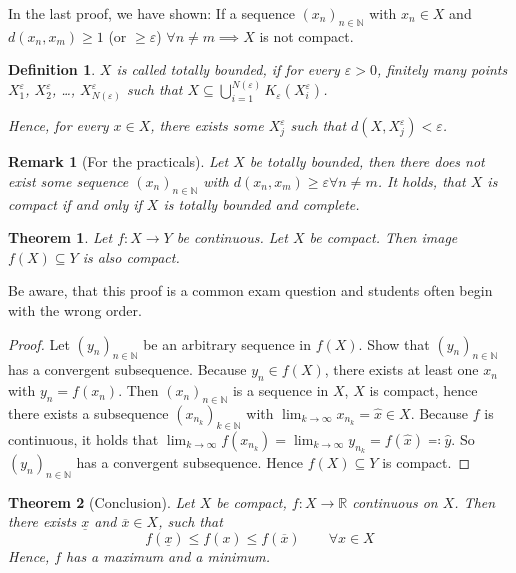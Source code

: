 \documentclass{article}
\newtheorem{theorem}{Theorem}  \numberwithin{theorem}{section}
\newtheorem{definition}{Definition}  \numberwithin{definition}{section}
\newtheorem{remark}{Remark}  \numberwithin{remark}{section}
\begin{document}
In the last proof, we have shown: If a sequence $(x_n)_{n \in \mathbb N}$ with $x_n \in X$ and $d(x_n, x_m) \geq 1$ (or $\geq \varepsilon$) $\forall n \neq m \implies X$ is not compact.

\begin{definition}
  $X$ is called totally bounded, if for every $\varepsilon > 0$, finitely many points $X_1^\varepsilon$, $X_2^\varepsilon$, \dots, $X_{N(\varepsilon)}^\varepsilon$ such that $X \subseteq \bigcup_{i=1}^{N(\varepsilon)} K_{\varepsilon}(X_i^\varepsilon)$.

  Hence, for every $x \in X$, there exists some $X_j^\varepsilon$ such that $d(X, X_j^\varepsilon) < \varepsilon$.
\end{definition}

\begin{remark}[For the practicals]
  Let $X$ be totally bounded, then there does not exist some sequence $(x_n)_{n \in \mathbb N}$ with $d(x_n, x_m) \geq \varepsilon \forall n \neq m$. It holds, that $X$ is compact if and only if $X$ is totally bounded and complete.
\end{remark}

\begin{theorem} %
  \label{satz6}
  Let $f: X \to Y$ be continuous. Let $X$ be compact. Then image $f(X) \subseteq Y$ is also compact.
\end{theorem}

Be aware, that this proof is a common exam question and students often begin with the wrong order.

\begin{proof}
  Let $(y_n)_{n \in \mathbb N}$ be an arbitrary sequence in $f(X)$. Show that $(y_n)_{n\in\mathbb N}$ has a convergent subsequence.
  Because $y_n \in f(X)$, there exists at least one $x_n$ with $y_n = f(x_n)$.
  Then $(x_n)_{n \in \mathbb N}$ is a sequence in $X$, $X$ is compact, hence there exists a subsequence $(x_{n_k})_{k \in \mathbb N}$ with $\lim_{k\to\infty} x_{n_k} = \hat{x} \in X$. Because $f$ is continuous, it holds that $\lim_{k\to\infty} f(x_{n_k}) = \lim_{k\to\infty} y_{n_k} = f(\hat{x}) \eqqcolon \hat{y}$.
  So $(y_n)_{n\in\mathbb N}$ has a convergent subsequence. Hence $f(X) \subseteq Y$ is compact.
\end{proof}

\begin{theorem}[Conclusion] %
  \label{satz7}
  Let $X$ be compact, $f: X \to \mathbb R$ continuous on $X$.
  Then there exists $\underline{x}$ and $\overline{x} \in X$, such that
  \[ f(\underline{x}) \leq f(x) \leq f(\overline{x}) \qquad \forall x \in X \]
  Hence, $f$ has a maximum and a minimum.
\end{theorem}
\end{document}

